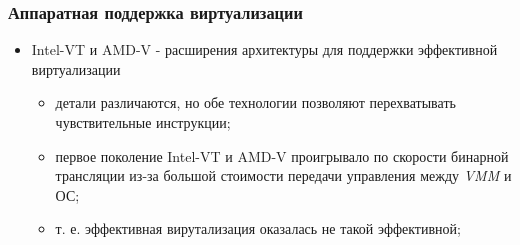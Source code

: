 \begin{frame}
\frametitle{Аппаратная поддержка виртуализации}
\begin{itemize}
  \item Intel-VT и AMD-V - расширения архитектуры для поддержки эффективной
        виртуализации
    \begin{itemize}
      \item детали различаются, но обе технологии позволяют перехватывать
            чувствительные инструкции;
      \item первое поколение Intel-VT и AMD-V проигрывало по скорости бинарной
            трансляции из-за большой стоимости передачи управления между
            \emph{VMM} и ОС;
      \item т. е. эффективная вирутализация оказалась не такой эффективной;
    \end{itemize}
\end{itemize}
\end{frame}
